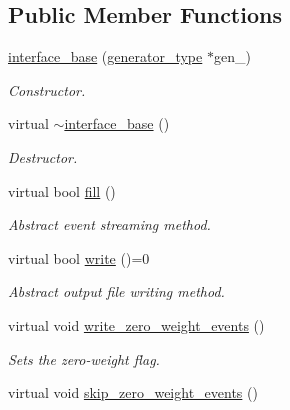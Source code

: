 \subsection*{Public Member Functions}
\begin{DoxyCompactItemize}
\item 
\hypertarget{a00313_ad5aa280d9d5791db4c4bfa3ab21a71a0}{\hyperlink{a00313_ad5aa280d9d5791db4c4bfa3ab21a71a0}{interface\-\_\-base} (\hyperlink{a00442}{generator\-\_\-type} $\ast$gen\-\_\-)}\label{a00313_ad5aa280d9d5791db4c4bfa3ab21a71a0}

\begin{DoxyCompactList}\small\item\em Constructor. \end{DoxyCompactList}\item 
\hypertarget{a00313_af811ce3f77ff217011b339a53f2507ee}{virtual \hyperlink{a00313_af811ce3f77ff217011b339a53f2507ee}{$\sim$interface\-\_\-base} ()}\label{a00313_af811ce3f77ff217011b339a53f2507ee}

\begin{DoxyCompactList}\small\item\em Destructor. \end{DoxyCompactList}\item 
\hypertarget{a00313_ae5dbd7fe97bb31ed80a4d4602a963e31}{virtual bool \hyperlink{a00313_ae5dbd7fe97bb31ed80a4d4602a963e31}{fill} ()}\label{a00313_ae5dbd7fe97bb31ed80a4d4602a963e31}

\begin{DoxyCompactList}\small\item\em Abstract event streaming method. \end{DoxyCompactList}\item 
\hypertarget{a00313_a4ab5edd1d5ba146243849269ade7a199}{virtual bool \hyperlink{a00313_a4ab5edd1d5ba146243849269ade7a199}{write} ()=0}\label{a00313_a4ab5edd1d5ba146243849269ade7a199}

\begin{DoxyCompactList}\small\item\em Abstract output file writing method. \end{DoxyCompactList}\item 
\hypertarget{a00313_a2c638c7f905e650c1efda5cdabcd8896}{virtual void \hyperlink{a00313_a2c638c7f905e650c1efda5cdabcd8896}{write\-\_\-zero\-\_\-weight\-\_\-events} ()}\label{a00313_a2c638c7f905e650c1efda5cdabcd8896}

\begin{DoxyCompactList}\small\item\em Sets the zero-\/weight flag. \end{DoxyCompactList}\item 
\hypertarget{a00313_a714ae03167e9ecdb3c0c03774a191089}{virtual void \hyperlink{a00313_a714ae03167e9ecdb3c0c03774a191089}{skip\-\_\-zero\-\_\-weight\-\_\-events} ()}\label{a00313_a714ae03167e9ecdb3c0c03774a191089}


\end{DoxyCompactItemize}
